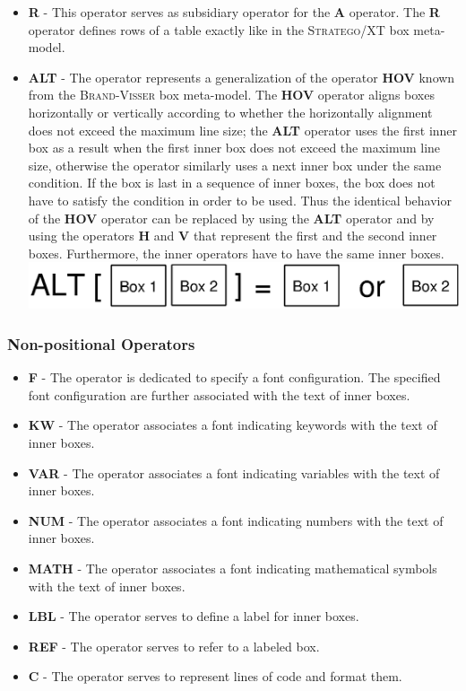 \documentclass[12pt,notitlepage,a4paper]{report}
\begin{document}
\begin{itemize}
\item \textbf{R} - This operator serves as subsidiary operator for the \textbf{A} operator. The \textbf{R} operator  defines rows of a table exactly like in the \textsc{Stratego/XT} box meta-model. 
\item \textbf{ALT} - The operator represents a generalization of the operator \textbf{HOV} known from the \textsc{Brand-Visser} box meta-model. The \textbf{HOV} operator aligns boxes horizontally or vertically according to whether the horizontally alignment does not exceed the maximum line size; the \textbf{ALT} operator uses the first inner box as a result when the first inner box does not exceed the maximum line size, otherwise the operator similarly uses a next inner box under the same condition. If the box is last in a sequence of inner boxes, the box does not have to satisfy the condition in order to be used. Thus the identical behavior of the \textbf{HOV} operator can be replaced by using the \textbf{ALT} operator  and by using the operators \textbf{H} and \textbf{V} that represent the first and the second inner boxes. Furthermore, the inner operators have to have the same inner boxes.
\includegraphics[scale=0.4]{pictures/DeJonge-ALT.eps}
\end{itemize}

\subsubsection{Non-positional Operators}
\begin{itemize}
\item \textbf{F} - The operator is dedicated to specify a font configuration. The specified font configuration are further associated with the text of inner boxes.
\item \textbf{KW} - The operator associates a font indicating keywords with the text of inner boxes. 
\item \textbf{VAR} - The operator associates a font indicating variables with the text of inner boxes. 
\item \textbf{NUM} - The operator associates a font indicating numbers with the text of inner boxes. 
\item \textbf{MATH} - The operator associates a font indicating mathematical symbols with the text of inner boxes. 
\item \textbf{LBL} - The operator serves to define a label for inner boxes. 
\item \textbf{REF} - The operator serves to refer to a labeled box.
\item \textbf{C} - The operator serves to represent lines of code and format them.
\end{itemize}
\end{document}
